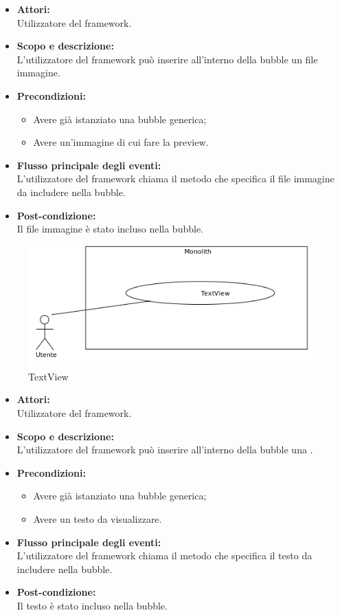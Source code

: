 \begin{itemize}
	\item \textbf{Attori:}
	\\Utilizzatore del framework.
	\item \textbf{Scopo e descrizione:} 
	\\L'utilizzatore del framework può inserire all'interno della bubble un file immagine.
	\item \textbf{Precondizioni:}
	\begin{itemize}
		\item Avere già istanziato una bubble generica;
		\item Avere un'immagine di cui fare la preview.
	\end{itemize}
	\item \textbf{Flusso principale degli eventi:}
	\\L'utilizzatore del framework chiama il metodo che specifica il file immagine da includere nella bubble.
	\item \textbf{Post-condizione:}
	\\Il file immagine è stato incluso nella bubble.
\end{itemize}


\begin{figure}[H]
	\centering
	\includegraphics[width=15cm]{../../documenti/AnalisiDeiRequisiti/Diagrammi_img/uc1_26.png}
	\caption{\UCFCaption{} TextView}
\end{figure}

\begin{itemize}
	\item \textbf{Attori:}
	\\Utilizzatore del framework.
	\item \textbf{Scopo e descrizione:} 
	\\L'utilizzatore del framework può inserire all'interno della bubble una .
	\item \textbf{Precondizioni:}
	\begin{itemize}
		\item Avere già istanziato una bubble generica;
		\item Avere un testo da visualizzare.
	\end{itemize}
	\item \textbf{Flusso principale degli eventi:}
	\\L'utilizzatore del framework chiama il metodo che specifica il testo da includere nella bubble.
	\item \textbf{Post-condizione:}
	\\Il testo è stato incluso nella bubble.
\end{itemize}

